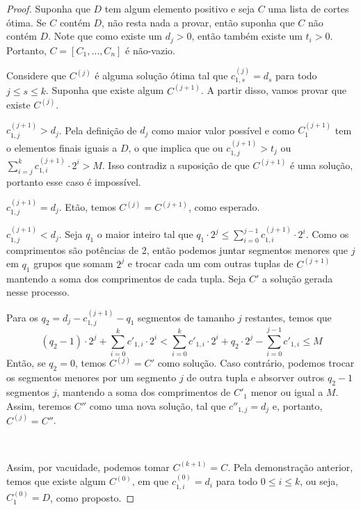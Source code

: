 \begin{proof}
    Suponha que $D$ tem algum elemento positivo e seja $C$ uma lista de cortes ótima. Se $C$ contém $D$, não resta nada a provar, então suponha que $C$ não contém $D$. Note que como existe um $d_j > 0$, então também existe um $t_i > 0$. Portanto, $C = [C_1, \ldots, C_n]$ é não-vazio.

    Considere que $C^{(j)}$ é alguma solução ótima tal que $c^{(j)}_{1, s} = d_s$ para todo $j \leq s \leq k$. Suponha que existe algum $C^{(j + 1)}$. A partir disso, vamos provar que existe $C^{(j)}$.

    \begin{casos}
        \item $c^{(j + 1)}_{1, j} > d_j$. Pela definição de $d_j$ como maior valor possível e como $C^{(j + 1)}_1$ tem o elementos finais iguais a $D$, o que implica que ou $c^{(j + 1)}_{1, j} > t_j$ ou $\sum_{i = j}^k c^{(j + 1)}_{1, i} \cdot 2^i > M$. Isso contradiz a suposição de que $C^{(j + 1)}$ é uma solução, portanto esse caso é impossível.

        \item $c^{(j + 1)}_{1, j} = d_j$. Etão, temos $C^{(j)} = C^{(j + 1)}$, como esperado.

        \item $c^{(j + 1)}_{1, j} < d_j$. Seja $q_1$ o maior inteiro tal que $q_1 \cdot 2^j \leq \sum_{i = 0}^{j - 1} c^{(j + 1)}_{1, i} \cdot 2^i$. Como os comprimentos são potências de 2, então podemos juntar segmentos menores que $j$ em $q_1$ grupos que somam $2^j$ e trocar cada um com outras tuplas de $C^{(j + 1)}$ mantendo a soma dos comprimentos de cada tupla. Seja $C'$ a solução gerada nesse processo.

        Para os $q_2 = d_j - c^{(j + 1)}_{1, j} - q_1$ segmentos de tamanho $j$ restantes, temos que \[
            (q_2 - 1) \cdot 2^j + \sum_{i = 0}^k c'_{1, i} \cdot 2^i < \sum_{i = 0}^k c'_{1, i} \cdot 2^i + q_2 \cdot 2^j - \sum_{i = 0}^{j - 1} c'_{1, i} \leq M
        \]
        Então, se $q_2 = 0$, temos $C^{(j)} = C'$ como solução. Caso contrário, podemos trocar os segmentos menores por um segmento $j$ de outra tupla e absorver outros $q_2 - 1$ segmentos $j$, mantendo a soma dos comprimentos de $C'_1$ menor ou igual a $M$. Assim, teremos $C''$ como uma nova solução, tal que $c''_{1, j} = d_j$ e, portanto, $C^{(j)} = C''$.
    \end{casos}

    ~

    Assim, por vacuidade, podemos tomar $C^{(k + 1)} = C$. Pela demonstração anterior, temos que existe algum $C^{(0)}$, em que $c^{(0)}_{1,i} = d_i$ para todo $0 \leq i \leq k$, ou seja, $C^{(0)}_1 = D$, como proposto.
\end{proof}

